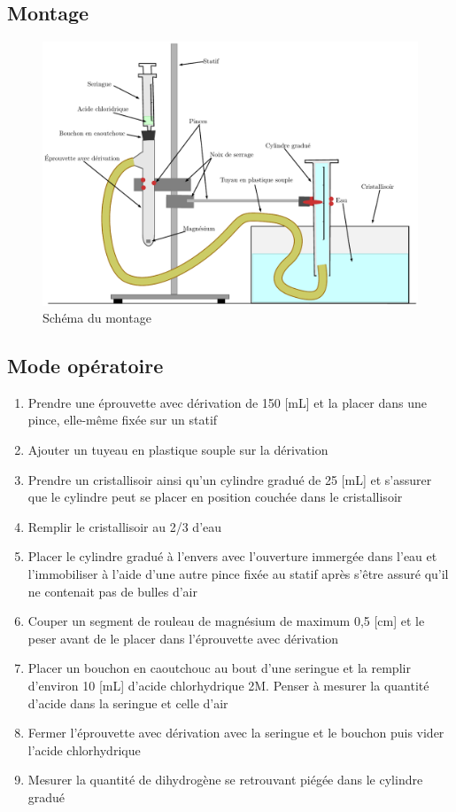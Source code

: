 \documentclass[11pt]{article}
\begin{document}
\subsection{Montage}
\begin{figure}[H]
\includegraphics[scale=0.8]{schema-montage.pdf}
\caption{Schéma du montage}
\label{figure:schem-montage}
\end{figure}

\subsection{Mode opératoire}
\begin{enumerate}
\item Prendre une éprouvette avec dérivation de 150 [mL] et la placer dans une pince, elle-même fixée sur un statif
\item Ajouter un tuyeau en plastique souple sur la dérivation
\item Prendre un cristallisoir ainsi qu'un cylindre gradué de 25 [mL] et s'assurer que le cylindre peut se placer en position couchée dans le cristallisoir
\item Remplir le cristallisoir au 2/3 d'eau
\item Placer le cylindre gradué à l'envers avec l'ouverture immergée dans l'eau et l'immobiliser à l'aide d'une autre pince fixée au statif après s'être assuré qu'il ne contenait pas de bulles d'air
\item Couper un segment de rouleau de magnésium de maximum 0,5 [cm] et le peser avant de le placer dans l'éprouvette avec dérivation
\item Placer un bouchon en caoutchouc au bout d'une seringue et la remplir d'environ 10 [mL] d'acide chlorhydrique 2M. Penser à mesurer la quantité d'acide dans la seringue et celle d'air
\item Fermer l'éprouvette avec dérivation avec la seringue et le bouchon puis vider l'acide chlorhydrique
\item Mesurer la quantité de dihydrogène se retrouvant piégée dans le cylindre gradué
\end{enumerate}
\end{document}
